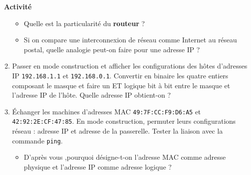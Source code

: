 \documentclass[
  11pt,
]{article}
\newcommand{\passthrough}[1]{#1}
\providecommand{\tightlist}{%
  \setlength{\itemsep}{0pt}\setlength{\parskip}{0pt}}
\newcounter{activite}
\newenvironment{activite}[1]
{\par \medskip   \noindent   \addtocounter{activite}{1}
\begin{bclogo}[arrondi =0.1,   noborder = true, logo=\bcvelo, marge=4]{~\textbf{Activité} \textbf{\theactivite} {\itshape #1} }  \par}
{
\end{bclogo}
 \par \bigskip }
\newcounter{logi}
\begin{document}
\begin{activite}{}
\begin{enumerate}
  \begin{itemize}
  \item
    Quelle est la particularité du \textbf{routeur} ?
  \item
    Si on compare une interconnexion de réseau comme Internet au réseau
    postal, quelle analogie peut-on faire pour une adresse IP ?
  \end{itemize}
\item
  Passer en mode construction et afficher les configurations des hôtes
  d'adresses IP \passthrough{\lstinline!192.168.1.1!} et
  \passthrough{\lstinline!192.168.0.1!}. Convertir en binaire les quatre
  entiers composant le masque et faire un ET logique bit à bit entre le
  masque et l'adresse IP de l'hôte. Quelle adresse IP obtient-on ?
\item
  Échanger les machines d'adresses MAC
  \passthrough{\lstinline!49:7F:CC:F9:D6:A5!} et
  \passthrough{\lstinline!42:92:2E:CF:47:85!}. En mode construction,
  permuter leurs configurations réseau : adresse IP et adresse de la
  passerelle. Tester la liaison avec la commande
  \passthrough{\lstinline!ping!}.

  \begin{itemize}
  \tightlist
  \item
    D'après vous ,pourquoi désigne-t-on l'adresse MAC comme adresse
    physique et l'adresse IP comme adresse logique ?
  \end{itemize}
\end{enumerate}

\end{activite}
\end{document}
